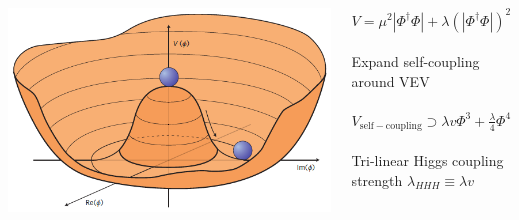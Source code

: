\documentclass{beamer}
\newcommand*{\header}[1]{\fontsize{16}{8}\selectfont \textbf{{\color{MyPurple}{#1}}}}
\begin{document}
\begin{frame}
\begin{center}
\header{Higgs Self-Coupling}
\end{center}
\begin{columns}
\begin{column}{0.5\textwidth}
\includegraphics[width=1\textwidth]{figures/higgspotential}
\end{column}
\begin{column}{0.5\textwidth}
\color{MyPurple}{Higgs Potential}\color{black}
\begin{center}
$V = \mu^2|\Phi^{\dagger}\Phi| + \lambda(|\Phi^{\dagger}\Phi|)^2$\\~\\
Expand self-coupling around VEV\\~\\
$V_\mathrm{self-coupling} \supset{} \lambda{}v\Phi^3 + \frac{\lambda}{4}\Phi^4$\\~\\
Tri-linear Higgs coupling strength $\lambda_{HHH}\equiv{}\lambda v$
\end{center}
\end{column}
\end{columns}
\end{frame}
\end{document}
